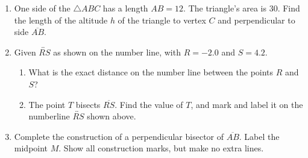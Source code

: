 \documentclass[12pt, twoside]{article}
\begin{document}
\begin{enumerate}
\newpage

\item One side of the $\triangle ABC$ has a length $AB=12$. The triangle's area is 30. Find the length of the altitude $h$ of the triangle to vertex $C$ and perpendicular to side $\overline{AB}$.\\[0.5cm]
   \vspace{1.0cm}


\item Given $\overleftrightarrow{RS}$ as shown on the number line, with $R=-2.0$ and $S=4.2$. \\[20pt] %
  \begin{enumerate}
    \item What is the exact distance on the number line between the points $R$ and $S$? \vspace{3cm} 
    \item The point $T$ bisects $\overline{RS}$. Find the value of $T$, and mark and label it on the numberline $\overleftrightarrow{RS}$ shown above. 
  \end{enumerate} \vspace{3cm}  
  
\newpage

\item Complete the construction of a perpendicular bisector of $\overline{AB}$. Label the midpoint $M$. Show all construction marks, but make no extra lines. \vspace{2cm}
  \begin{center}
  \end{center} \vspace{4cm}


\end{enumerate}
\end{document}
